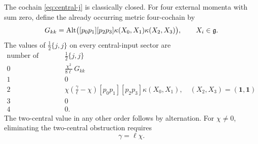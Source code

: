\begin{proposition}
\label{prop:central-square}
The cochain \eqref{eq:central-j} is classically closed.
For four external momenta with sum zero, define the already occurring
metric four-cochain by
\begin{equation}
 G_{kk}=\operatorname{Alt}\bigl([p_0p_1][p_2p_3]
                 \kappa(X_0,X_1)\kappa(X_2,X_3)\bigr),
 \qquad X_i\in\mathfrak g.
\end{equation}
The values of $\tfrac12\{j,j\}$ on every central-input sector are
\begin{equation}
\begin{array}{c|l}
 \text{number of central inputs}&\tfrac12\{j,j\}\\ \hline
 0&\displaystyle \frac{\chi^2}{8\ell}\,G_{kk}\\[2mm]
 1&0\\[1mm]
 2&\displaystyle
 \chi\left(\frac\gamma\ell-\chi\right)
 [p_0p_1][p_2p_3]\kappa(X_0,X_1),
 \quad (X_2,X_3)=(\mathbf1,\mathbf1)\\[2mm]
 3&0\\[1mm]
 4&0.
\end{array}
\label{eq:central-square-sectors}
\end{equation}
The two-central value in any other order follows by alternation.
For $\chi\ne0$, eliminating the two-central obstruction requires
\begin{equation}
 \gamma=\ell\chi.
 \label{eq:central-necessary}
\end{equation}
\end{proposition}

